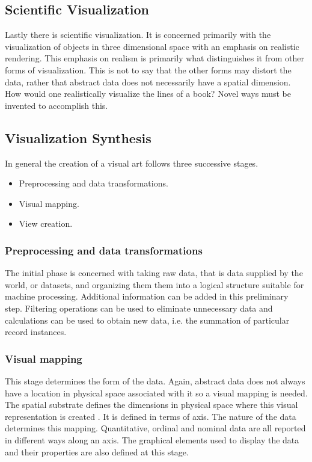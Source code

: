 \documentclass[a4paper, 10pt, titlepage]{article}
\begin{document}
\subsection{Scientific Visualization}
Lastly there is scientific visualization. It is concerned primarily with the visualization of objects in three dimensional space with an emphasis on realistic rendering. This emphasis on realism is primarily what distinguishes it from other forms of visualization. This is not to say that the other forms may distort the data, rather that abstract data does not necessarily have a spatial dimension. How would one realistically visualize the lines of a book? Novel ways must be invented to accomplish this.
\subsection{Visualization Synthesis}
In general the creation of a visual art follows three successive stages\cite{mazza2009introduction}.
\begin{itemize}
\item Preprocessing and data transformations.
\item Visual mapping.
\item View creation.
\end{itemize}
\subsubsection{Preprocessing and data transformations}
The initial phase is concerned with taking raw data, that is data supplied by the world, or datasets, and organizing them them into a logical structure suitable for machine processing. Additional information can be added in this preliminary step. Filtering operations can be used to eliminate unnecessary data and calculations can be used to obtain new data, i.e. the summation of particular record instances.
\subsubsection{Visual mapping}
This stage determines the form of the data. Again, abstract data does not always have a location in physical space associated with it so a visual mapping is needed. The spatial substrate defines the dimensions in physical space where this visual representation is created \cite{mazza2009introduction}. It is defined in terms of axis. The nature of the data determines this mapping. Quantitative, ordinal and nominal data are all reported in different ways along an axis. The graphical elements used to display the data and their properties are also defined at this stage.
\end{document}
